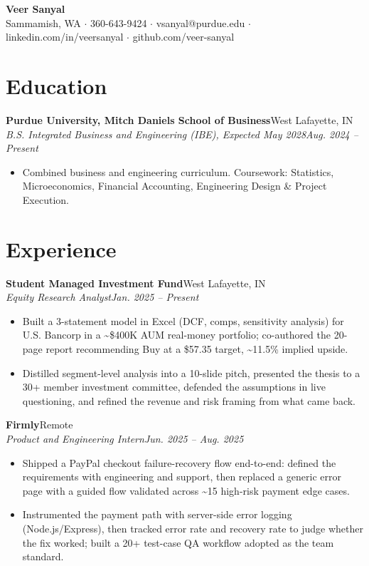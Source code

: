 \documentclass[10pt,letterpaper]{article}
\newcommand{\entry}[4]{%
  \textbf{#1}\hfill #2\\[1pt]
  \textit{#3}\hfill \textit{#4}\\[2pt]
}
\begin{document}
\begin{center}
  {\LARGE \textbf{Veer Sanyal}}\\[3pt]
  Sammamish, WA $\cdot$ 360-643-9424 $\cdot$ vsanyal@purdue.edu $\cdot$ linkedin.com/in/veersanyal $\cdot$ github.com/veer-sanyal
\end{center}

\section*{Education}
\textbf{Purdue University, Mitch Daniels School of Business}\hfill West Lafayette, IN\\[1pt]
\textit{B.S. Integrated Business and Engineering (IBE), Expected May 2028}\hfill \textit{Aug. 2024 -- Present}
\begin{itemize}
  \item Combined business and engineering curriculum. Coursework: Statistics, Microeconomics, Financial Accounting, Engineering Design \& Project Execution.
\end{itemize}

\section*{Experience}
\entry{Student Managed Investment Fund}{West Lafayette, IN}{Equity Research Analyst}{Jan. 2025 -- Present}
\begin{itemize}
  \item Built a 3-statement model in Excel (DCF, comps, sensitivity analysis) for U.S. Bancorp in a \textasciitilde\$400K AUM real-money portfolio; co-authored the 20-page report recommending Buy at a \$57.35 target, \textasciitilde11.5\% implied upside.
  \item Distilled segment-level analysis into a 10-slide pitch, presented the thesis to a 30+ member investment committee, defended the assumptions in live questioning, and refined the revenue and risk framing from what came back.
\end{itemize}

\entry{Firmly}{Remote}{Product and Engineering Intern}{Jun. 2025 -- Aug. 2025}
\begin{itemize}
  \item Shipped a PayPal checkout failure-recovery flow end-to-end: defined the requirements with engineering and support, then replaced a generic error page with a guided flow validated across \textasciitilde15 high-risk payment edge cases.
  \item Instrumented the payment path with server-side error logging (Node.js/Express), then tracked error rate and recovery rate to judge whether the fix worked; built a 20+ test-case QA workflow adopted as the team standard.
\end{itemize}
\end{document}
